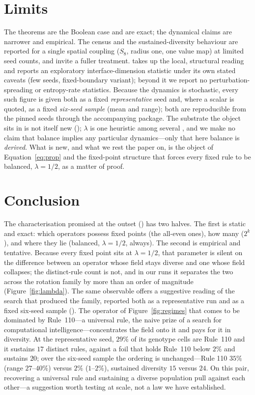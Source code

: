 \documentclass[man,12pt,floatsintext]{apa7}
\newcommand{\secref}[1]{\emph{\nameref{#1}}}
\begin{document}
\section{Limits}
\label{sec:limits}

The theorems are the Boolean case and are exact; the dynamical claims are
narrower and empirical. The census and the sustained-diversity behaviour are
reported for a single spatial coupling ($S_8$, radius one, one value map) at
limited seed counts, and invite a fuller treatment. \secref{sec:discussion}
takes up the local, structural reading and reports an exploratory
interface-dimension statistic under its own stated caveats (few seeds,
fixed-boundary variant); beyond it we report no perturbation-spreading or
entropy-rate statistics.
Because the dynamics is stochastic, every such figure is given both as a
fixed \emph{representative} seed and, where a scalar is quoted, as a fixed
\emph{six-seed sample} (mean and range); both are reproducible from the
pinned seeds through the accompanying package. The
substrate the object sits in is not itself new (\secref{sec:object}); $\lambda$
is one heuristic among several \parencite{wuensche1999classifying}, and we
make no claim that balance implies any particular dynamics---only that here
balance is \emph{derived}. What is new, and what we rest the paper on, is the
object of Equation~\eqref{eq:prop} and the fixed-point structure that forces
every fixed rule to be balanced, $\lambda = 1/2$, as a matter of proof.

\section{Conclusion}
\label{sec:conclusion}

The characterisation promised at the outset (\secref{sec:object}) has two
halves. The
first is static and exact: which operators possess fixed points (the
all-even ones), how many ($2^k$), and where they lie (balanced,
$\lambda = 1/2$, always). The second is empirical and tentative. Because
every fixed point sits at $\lambda = 1/2$, that parameter is silent on the
difference between an operator whose field stays diverse and one whose field
collapses; the distinct-rule count is not, and in our
runs it separates the two across the rotation family by more than an order of
magnitude (Figure~\ref{fig:lambda}). The same observable offers a suggestive
reading of the search that produced the family, reported both as a
representative run and as a fixed six-seed sample (\secref{sec:limits}). The
operator of Figure~\ref{fig:regimes} that comes to be dominated by
Rule~110---a universal rule, the naive prize of a search for computational
intelligence---concentrates the field onto it and pays for it in diversity.
At the representative seed, $29\%$ of its genotype cells are Rule~110 and it
sustains $17$ distinct rules, against a foil that holds Rule~110 below $2\%$
and sustains $20$; over the six-seed sample the ordering is unchanged---Rule
110 $35\%$ (range $27$--$40\%$) versus $2\%$ ($1$--$2\%$), sustained diversity
$15$ versus $24$. On this pair, recovering a universal rule and sustaining a
diverse population pull against each other---a suggestion worth testing at
scale, not a law we have established.
\end{document}
